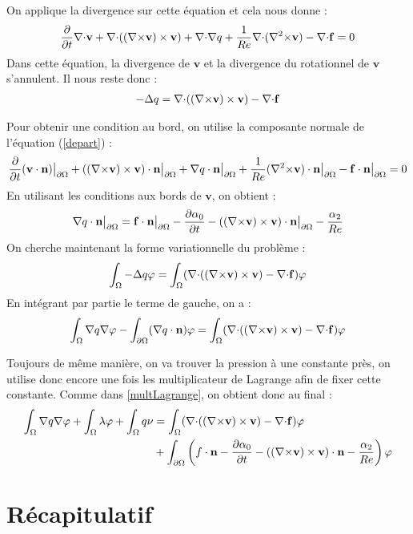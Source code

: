 On applique la divergence sur cette équation et cela nous donne :
\[ \frac{\partial}{\partial t}{\nabla\cdot} \mathbf{v} + {\nabla\cdot}(({\nabla\times} \mathbf{v})\times \mathbf{v}) + {\nabla\cdot}{\nabla} q + \frac{1}{Re}{\nabla\cdot}({\nabla^2\times} \mathbf{v}) - {\nabla\cdot} \mathbf{f} = 0 \]
Dans cette équation, la divergence de $\mathbf{v}$ et la divergence du rotationnel de $\mathbf{v}$ s'annulent. Il nous reste donc :
\begin{eqnarray}\label{q}
-{\Delta} q = {\nabla\cdot}(({\nabla\times} \mathbf{v})\times \mathbf{v}) - {\nabla\cdot} \mathbf{f}
\end{eqnarray}

Pour obtenir une condition au bord, on utilise la composante normale de l'équation (\ref{depart}) :
\[ \frac{\partial}{\partial t}(\mathbf{v}\cdot \mathbf{n}){\big\rvert_{\partial\Omega}} + (({\nabla\times} \mathbf{v})\times \mathbf{v})\cdot \mathbf{n}{\big\rvert_{\partial\Omega}} + {\nabla} q\cdot \mathbf{n}{\big\rvert_{\partial\Omega}} +\frac{1}{Re}({\nabla^2\times} \mathbf{v})\cdot \mathbf{n}{\big\rvert_{\partial\Omega}} - \mathbf{f}\cdot \mathbf{n}{\big\rvert_{\partial\Omega}} = 0 \]
En utilisant les conditions aux bords de $\mathbf{v}$, on obtient :
\[ {\nabla} q\cdot \mathbf{n}{\big\rvert_{\partial\Omega}} =  \mathbf{f}\cdot \mathbf{n}{\big\rvert_{\partial\Omega}} - \frac{\partial\alpha_0}{\partial t} - (({\nabla\times} \mathbf{v})\times \mathbf{v})\cdot \mathbf{n}{\big\rvert_{\partial\Omega}} - \frac{\alpha_2}{Re} \]
On cherche maintenant la forme variationnelle du problème :
\[ \int_\Omega -{\Delta} q\varphi = \int_\Omega ({\nabla\cdot}(({\nabla\times} \mathbf{v})\times \mathbf{v}) -{\nabla\cdot} \mathbf{f})\varphi \]
En intégrant par partie le terme de gauche, on a :
\[ \int_\Omega {\nabla} q{\nabla}\varphi - \int_{\partial\Omega} ({\nabla} q\cdot \mathbf{n})\varphi = \int_\Omega ({\nabla\cdot}(({\nabla\times} \mathbf{v})\times \mathbf{v}) -{\nabla\cdot} \mathbf{f})\varphi \]

Toujours de même manière, on va trouver la pression à une constante près, on utilise donc encore une fois les multiplicateur de Lagrange afin de fixer cette constante. Comme dans \ref{multLagrange}, on obtient donc au final :
\begin{equation}\label{fvq}
\begin{aligned}
\int_\Omega {\nabla} q{\nabla}\varphi + \int_\Omega \lambda\varphi + \int_\Omega q\nu &= \int_\Omega ({\nabla\cdot}(({\nabla\times} \mathbf{v})\times \mathbf{v}) -{\nabla\cdot} \mathbf{f})\varphi\\
&+ \int_{\partial\Omega} \left(f\cdot \mathbf{n} - \frac{\partial\alpha_0}{\partial t} - (({\nabla\times} \mathbf{v})\times \mathbf{v})\cdot \mathbf{n} - \frac{\alpha_2}{Re}\right)\varphi
\end{aligned}
\end{equation}

\chapter{Récapitulatif}

